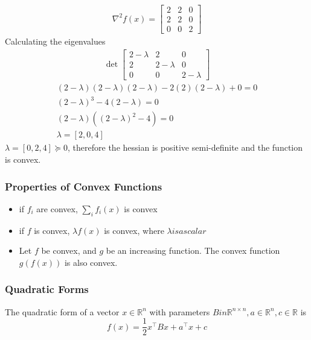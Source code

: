 \begin{align}
  \nabla^2 f(x) = 
  \begin{bmatrix}
     2 & 2 & 0 \\
     2 & 2 & 0 \\
     0 & 0 & 2
  \end{bmatrix}
\end{align}
Calculating the eigenvalues
\begin{align} \det
  \begin{bmatrix}
    2 - \lambda& 2 & 0 \\
    2 & 2 - \lambda & 0 \\
    0 & 0 & 2 - \lambda
  \end{bmatrix} 
\end{align}
\begin{gather}
  (2-\lambda)(2-\lambda)(2-\lambda) - 2(2)(2-\lambda) + 0= 0 \\
  (2-\lambda)^3 - 4(2-\lambda) = 0 \\
  (2-\lambda)((2-\lambda)^2 - 4) = 0 \\
  \lambda = [2, 0, 4]
\end{gather}
$\lambda = [0,2,4] \succeq 0$, therefore the hessian is positive semi-definite and the function is convex.
\subsubsection{Properties of Convex Functions}
\begin{itemize}
  \item if $f_i$ are convex, $\sum_i f_i(x)$ is convex
  \item if $f$ is convex, $\lambda f(x)$ is convex, where $\lambda is a scalar$
  \item Let $f$ be convex, and $g$ be an increasing function. The convex function $g(f(x))$ is also convex.
\end{itemize}

\subsubsection{Quadratic Forms}
The quadratic form of a vector $x \in \mathbb{R}^n$ with parameters $B in \mathbb{R}^{n \times n}, a \in \mathbb{R}^n, c \in \mathbb{R}$ is
\begin{equation}
  f(x) = \frac{1}{2} x^\top B x + a^\top x + c
\end{equation}